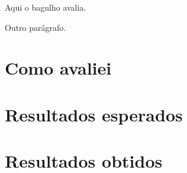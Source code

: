 
Aqui o bagulho avalia.

Outro parágrafo.

\section{Como avaliei}
\section{Resultados esperados}
\section{Resultados obtidos}